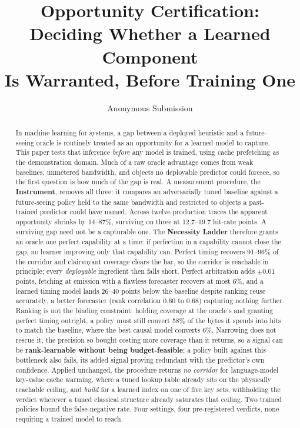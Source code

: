 \documentclass[letterpaper]{article} %
\title{Opportunity Certification: Deciding Whether a Learned Component\\ Is Warranted, Before Training One}
\author{Anonymous Submission}
\begin{document}
\maketitle

\begin{abstract}
\noindent In machine learning for systems, a gap between a deployed heuristic and a future-seeing oracle is routinely treated as an opportunity for a learned model to capture. This paper tests that inference \emph{before} any model is trained, using cache prefetching as the demonstration domain. Much of a raw oracle advantage comes from weak baselines, unmetered bandwidth, and objects no deployable predictor could foresee, so the first question is how much of the gap is real. A measurement procedure, the \textbf{Instrument}, removes all three: it compares an adversarially tuned baseline against a future-seeing policy held to the same bandwidth and restricted to objects a past-trained predictor could have named. Across twelve production traces the apparent opportunity shrinks by 14--87\%, surviving on three at 12.7--19.7 hit-rate points. A surviving gap need not be a capturable one. The \textbf{Necessity Ladder} therefore grants an oracle one perfect capability at a time: if perfection in a capability cannot close the gap, no learner improving only that capability can. Perfect timing recovers 91--96\% of the corridor and clairvoyant coverage clears the bar, so the corridor is reachable in principle; every \emph{deployable} ingredient then falls short. Perfect arbitration adds $\pm 0.01$ points, fetching at emission with a flawless forecaster recovers at most 6\%, and a learned timing model lands 26--40 points below the baseline despite ranking reuse accurately, a better forecaster (rank correlation $0.60$ to $0.68$) capturing nothing further. Ranking is not the binding constraint: holding coverage at the oracle's and granting perfect timing outright, a policy must still convert 58\% of the bytes it spends into hits to match the baseline, where the best causal model converts 6\%. Narrowing does not rescue it, the precision so bought costing more coverage than it returns, so a signal can be \textbf{rank-learnable without being budget-feasible}; a policy built against this bottleneck also fails, its added signal proving redundant with the predictor's own confidence. Applied unchanged, the procedure returns \emph{no corridor} for language-model key-value cache warming, where a tuned lookup table already sits on the physically reachable ceiling, and \emph{build} for a learned index on one of five key sets, withholding the verdict wherever a tuned classical structure already saturates that ceiling. Two trained policies bound the false-negative rate. Four settings, four pre-registered verdicts, none requiring a trained model to reach.
\end{abstract}
\end{document}
